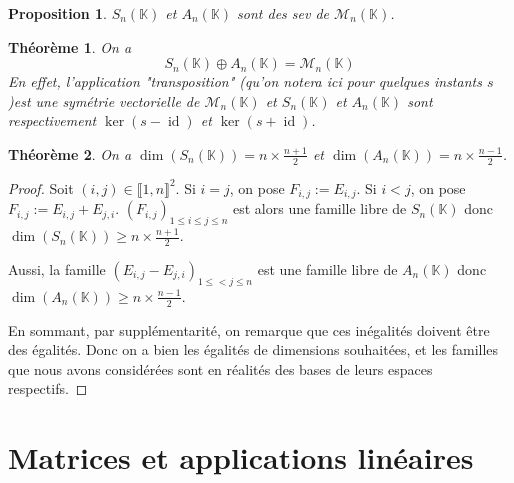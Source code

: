 \documentclass[french]{book}
\newcommand{\K}{\mathbb{K}}
\theoremstyle{plain}
\newtheorem{thm}{Théorème}[chapter]
\newtheorem{prop}{Proposition}[chapter]
\theoremstyle{definition}
\theoremstyle{remark}
\DeclareMathOperator{\id}{id}
\begin{document}
\begin{prop}
	$S_n(\K)$ et $A_n(\K)$ sont des sev de $\mathcal{M}_n(\K)$.
\end{prop}
\begin{thm}
	On a $$S_n(\K)\oplus A_n(\K)=\mathcal{M}_n(\K)$$ En effet, l'application "transposition" (qu'on notera ici pour quelques instants $s$)est une symétrie vectorielle de $\mathcal{M}_n(\K)$ et $S_n(\K)$ et $A_n(\K)$ sont respectivement $\ker(s-\id)$ et $\ker(s+\id)$.
\end{thm}
\begin{thm}
	On a $\dim(S_n(\K))=n\times\displaystyle\frac{n+1}{2}$ et $\dim(A_n(\K))=n\times\displaystyle\frac{n-1}{2}$.
\end{thm}
\begin{proof}
	Soit $(i,j)\in\llbracket1,n\rrbracket^2$. Si $i=j$, on pose $F_{i,j}:=E_{i,j}$. Si $i<j$, on pose $F_{i,j}:=E_{i,j}+E_{j,i}$. $(F_{i,j})_{1\leqslant i\leqslant j\leqslant n}$ est alors une famille libre de $S_n(\K)$ donc $\dim(S_n(\K))\geqslant\displaystyle n\times\frac{n+1}{2}$. \par Aussi, la famille $(E_{i,j}-E_{j,i})_{1\leqslant<j\leqslant n}$ est une famille libre de $A_n(\K)$ donc $\dim(A_n(\K))\geqslant n\times\frac{n-1}{2}$. \par En sommant, par supplémentarité, on remarque que ces inégalités doivent être des égalités. Donc on a bien les égalités de dimensions souhaitées, et les familles que nous avons considérées sont en réalités des bases de leurs espaces respectifs.
\end{proof}
\section{Matrices et applications linéaires}
\end{document}
